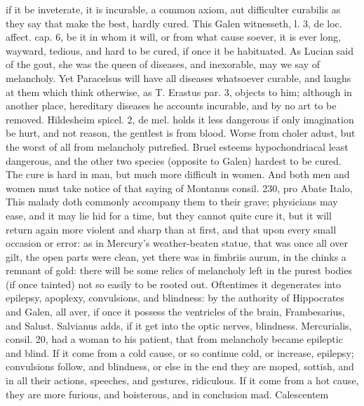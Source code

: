 if it be inveterate, it is incurable, a common axiom, aut
difficulter curabilis as they say that make the best, hardly cured.
This Galen witnesseth, l. 3, de loc. affect. cap. 6, be it in
whom it will, or from what cause soever, it is ever long, wayward,
tedious, and hard to be cured, if once it be habituated. As Lucian said
of the gout, she was the queen of diseases, and inexorable, may
we say of melancholy. Yet Paracelsus will have all diseases whatsoever
curable, and laughs at them which think otherwise, as T. Erastus par.
3, objects to him; although in another place, hereditary diseases he
accounts incurable, and by no art to be removed. Hildesheim
spicel. 2, de mel. holds it less dangerous if only imagination be
hurt, and not reason, the gentlest is from blood. Worse from
choler adust, but the worst of all from melancholy putrefied.
Bruel esteems hypochondriacal least dangerous, and the other two
species (opposite to Galen) hardest to be cured. The cure is hard
in man, but much more difficult in women. And both men and women must
take notice of that saying of Montanus consil. 230, pro Abate Italo,
This malady doth commonly accompany them to their grave;
physicians may ease, and it may lie hid for a time, but they cannot
quite cure it, but it will return again more violent and sharp than at
first, and that upon every small occasion or error: as in Mercury's
weather-beaten statue, that was once all over gilt, the open parts were
clean, yet there was in fimbriis aurum, in the chinks a remnant of
gold: there will be some relics of melancholy left in the purest bodies
(if once tainted) not so easily to be rooted out.  Oftentimes it
degenerates into epilepsy, apoplexy, convulsions, and blindness: by the
authority of Hippocrates and Galen, all aver, if once it possess
the ventricles of the brain, Frambesarius, and Salust. Salvianus adds,
if it get into the optic nerves, blindness. Mercurialis, consil. 20,
had a woman to his patient, that from melancholy became epileptic and
blind. If it come from a cold cause, or so continue cold, or
increase, epilepsy; convulsions follow, and blindness, or else in the
end they are moped, sottish, and in all their actions, speeches, and
gestures, ridiculous. If it come from a hot cause, they are more
furious, and boisterous, and in conclusion mad. Calescentem
